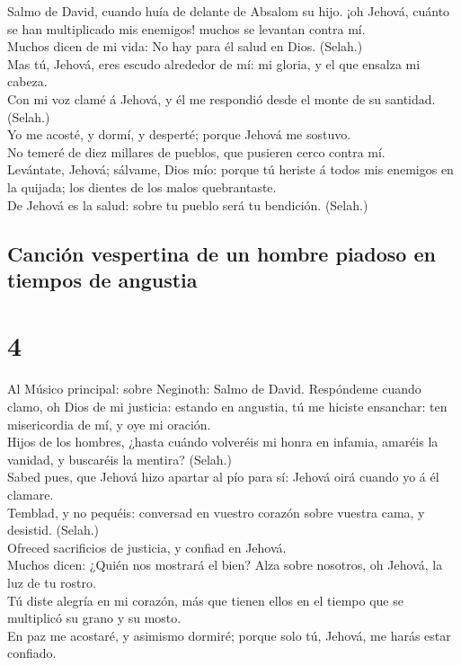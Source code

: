  Salmo de David, cuando huía de delante de Absalom su
hijo. ¡oh Jehová, cuánto se han multiplicado mis enemigos! muchos se
levantan contra mí.\\
 Muchos dicen de mi vida: No hay para él salud en Dios.
(Selah.)\\
 Mas tú, Jehová, eres escudo alrededor de mí: mi gloria, y
el que ensalza mi cabeza.\\
 Con mi voz clamé á Jehová, y él me respondió desde el
monte de su santidad. (Selah.)\\
 Yo me acosté, y dormí, y desperté; porque Jehová me
sostuvo.\\
 No temeré de diez millares de pueblos, que pusieren cerco
contra mí.\\
 Levántate, Jehová; sálvame, Dios mío: porque tú heriste á
todos mis enemigos en la quijada; los dientes de los malos
quebrantaste.\\
 De Jehová es la salud: sobre tu pueblo será tu bendición.
(Selah.)

\hypertarget{canciuxf3n-vespertina-de-un-hombre-piadoso-en-tiempos-de-angustia}{%
\subsection{Canción vespertina de un hombre piadoso en tiempos de
angustia}\label{canciuxf3n-vespertina-de-un-hombre-piadoso-en-tiempos-de-angustia}}

\hypertarget{section-3}{%
\section{4}\label{section-3}}

 Al Músico principal: sobre Neginoth: Salmo de David.
Respóndeme cuando clamo, oh Dios de mi justicia: estando en angustia, tú
me hiciste ensanchar: ten misericordia de mí, y oye mi oración.\\
 Hijos de los hombres, ¿hasta cuándo volveréis mi honra en
infamia, amaréis la vanidad, y buscaréis la mentira? (Selah.)\\
 Sabed pues, que Jehová hizo apartar al pío para sí:
Jehová oirá cuando yo á él clamare.\\
 Temblad, y no pequéis: conversad en vuestro corazón sobre
vuestra cama, y desistid. (Selah.)\\
 Ofreced sacrificios de justicia, y confiad en Jehová.\\
 Muchos dicen: ¿Quién nos mostrará el bien? Alza sobre
nosotros, oh Jehová, la luz de tu rostro.\\
 Tú diste alegría en mi corazón, más que tienen ellos en
el tiempo que se multiplicó su grano y su mosto.\\
 En paz me acostaré, y asimismo dormiré; porque solo tú,
Jehová, me harás estar confiado.

